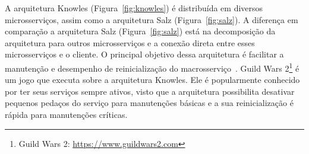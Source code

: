 A arquitetura Knowles (Figura~\ref{fig:knowles}) é distribuída em diversos microsserviços, assim como a arquitetura Salz (Figura~\ref{fig:salz}).
%
A diferença em comparação a arquitetura Salz (Figura~\ref{fig:salz}) está na decomposição da arquitetura para outros microsserviços e a conexão direta entre esses microsserviços e o cliente.
%
O principal objetivo dessa arquitetura é facilitar a manutenção e desempenho de reinicialização do macrosserviço~\cite{stephenclarkewillson2017}.
%
Guild Wars 2\footnote[3]{Guild Wars 2: \url{https://www.guildwars2.com}} é um jogo que executa sobre a arquitetura Knowles.
%
Ele é popularmente conhecido por ter seus serviços sempre ativos, visto que a arquitetura possibilita desativar pequenos pedaços do serviço para manutenções básicas e a sua reinicialização é rápida para manutenções críticas.
